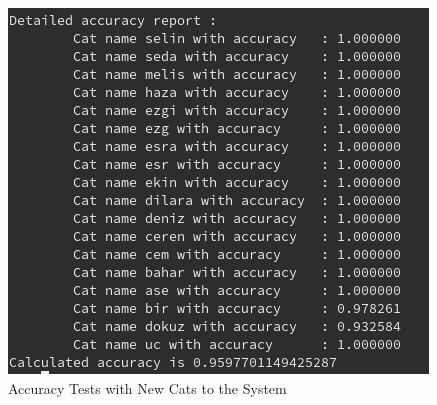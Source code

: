 \begin{figure}
    \centering
    \includegraphics[width=\linewidth]{content/040_image_processing/identification/img/yeniVeriEklenince.png}
    \caption{Accuracy Tests with New Cats to the System}
    \label{fig:yeniVeriEklenince}
\end{figure}


